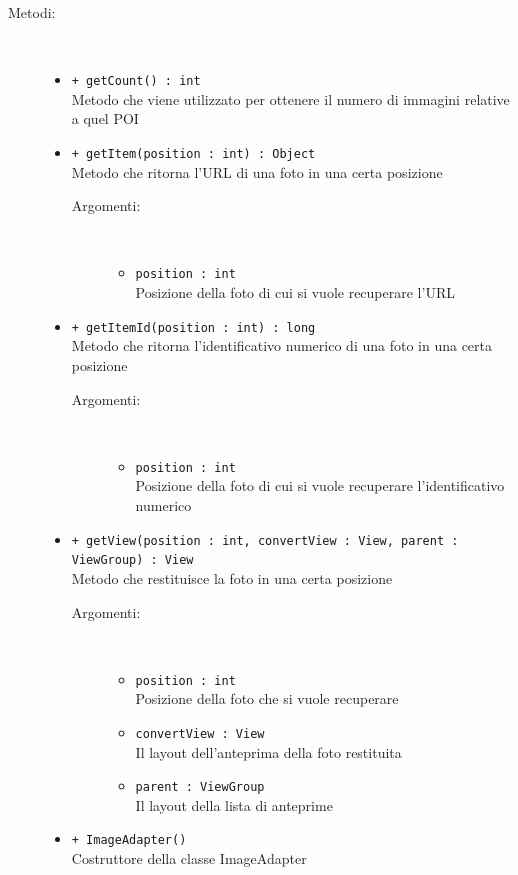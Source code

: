 \documentclass[../DefinizioneDiProdotto.tex]{subfiles}
\begin{document}
\begin{description}
\begin{itemize}
\end{itemize}
\item[Metodi:] \
\begin{itemize}
\item \texttt{+ getCount() : int}\\
Metodo che viene utilizzato per ottenere il numero di immagini relative a quel POI
 \item \texttt{+ getItem(position : int) : Object}\\
Metodo che ritorna l'URL di una foto in una certa posizione
 \begin{description}
\item[Argomenti:] \
\begin{itemize}
\item \texttt{position : int}\\
Posizione della foto di cui si vuole recuperare l'URL\end{itemize}
\end{description}
\item \texttt{+ getItemId(position  : int) : long}\\
Metodo che ritorna l'identificativo numerico di una foto in una certa posizione
 \begin{description}
\item[Argomenti:] \
\begin{itemize}
\item \texttt{position  : int}\\
Posizione della foto di cui si vuole recuperare l'identificativo numerico\end{itemize}
\end{description}
\item \texttt{+ getView(position  : int, convertView : View, parent : ViewGroup) : View}\\
Metodo che restituisce la foto in una certa posizione
 \begin{description}
\item[Argomenti:] \
\begin{itemize}
\item \texttt{position  : int}\\
Posizione della foto che si vuole recuperare\item \texttt{convertView : View}\\
Il layout dell'anteprima della foto restituita\item \texttt{parent : ViewGroup}\\
Il layout della lista di anteprime\end{itemize}
\end{description}
\item \texttt{+ ImageAdapter()}\\
Costruttore della classe ImageAdapter
 \end{itemize}
\end{description}
\end{document}
